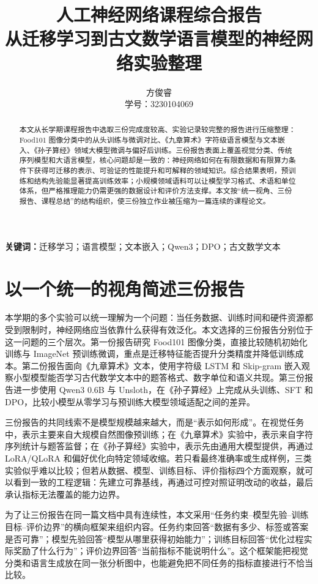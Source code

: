 \documentclass[a4paper,11pt,twocolumn]{article}
\title{\vspace{-0.8em}\textbf{人工神经网络课程综合报告}\\
\large 从迁移学习到古文数学语言模型的神经网络实验整理}
\author{方俊睿\\学号：3230104069}
\date{}
\begin{document}
\maketitle
\vspace{-1.0em}

\begin{abstract}
本文从长学期课程报告中选取三份完成度较高、实验记录较完整的报告进行压缩整理：Food101 图像分类中的从头训练与微调对比、《九章算术》字符级语言模型与文本嵌入、《孙子算经》领域大模型微调与偏好后训练。三份报告表面上覆盖视觉分类、传统序列模型和大语言模型，核心问题却是一致的：神经网络如何在有限数据和有限算力条件下获得可迁移的表示、可验证的性能提升和可解释的领域知识。综合结果表明，预训练和结构先验能显著提高训练效率；小规模领域语料可以让模型学习格式、术语和单位体系，但严格推理能力仍需更强的数据设计和评价方法支撑。本文按“统一视角、三份报告、课程总结”的结构组织，使三份独立作业被压缩为一篇连续的课程论文。
\end{abstract}

\noindent\textbf{关键词：}迁移学习；语言模型；文本嵌入；Qwen3；DPO；古文数学文本

\section{以一个统一的视角简述三份报告}

本学期的多个实验可以统一理解为一个问题：当任务数据、训练时间和硬件资源都受到限制时，神经网络应当依靠什么获得有效泛化。本文选择的三份报告分别位于这一问题的三个层次。第一份报告研究 Food101 图像分类，直接比较随机初始化训练与 ImageNet 预训练微调，重点是迁移特征能否提升分类精度并降低训练成本。第二份报告面向《九章算术》文本，使用字符级 LSTM 和 Skip-gram 嵌入观察小型模型能否学习古代数学文本中的题答格式、数字单位和语义共现。第三份报告进一步使用 Qwen3 0.6B 与 Unsloth，在《孙子算经》上完成从头训练、SFT 和 DPO，比较小模型从零学习与预训练大模型领域适配之间的差异。

三份报告的共同线索不是模型规模越来越大，而是“表示如何形成”。在视觉任务中，表示主要来自大规模自然图像预训练；在《九章算术》实验中，表示来自字符序列统计与题答监督；在《孙子算经》实验中，表示先由通用大模型提供，再通过 LoRA/QLoRA 和偏好优化向特定领域收缩。若只看最终准确率或生成样例，三类实验似乎难以比较；但若从数据、模型、训练目标、评价指标四个方面观察，就可以看到一致的工程逻辑：先建立可靠基线，再通过可控对照证明改动的收益，最后承认指标无法覆盖的能力边界。

为了让三份报告在同一篇文档中具有连续性，本文采用“任务约束--模型先验--训练目标--评价边界”的横向框架来组织内容。任务约束回答“数据有多少、标签或答案是否可靠”；模型先验回答“模型从哪里获得初始能力”；训练目标回答“优化过程实际奖励了什么行为”；评价边界回答“当前指标不能说明什么”。这个框架能把视觉分类和语言生成放在同一张分析图中，也能避免把不同任务的指标直接进行不恰当比较。
\end{document}
